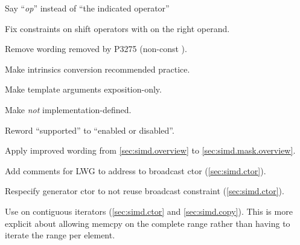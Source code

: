 \begin{revision}
\item Say “\textit{op}” instead of “the indicated operator”
\item Fix constraints on shift operators with \simdsizetype{} on the right operand.
\item Remove wording removed by P3275 (non-const ).
\item Make intrinsics conversion recommended practice.
\item Make  template arguments exposition-only.
\item Make  \emph{not} implementation-defined.
\item Reword “supported” to “enabled or disabled”.
\item Apply improved wording from \ref{sec:simd.overview} to \ref{sec:simd.mask.overview}.
\item Add comments for LWG to address to broadcast ctor (\ref{sec:simd.ctor}).
\item Respecify generator ctor to not reuse broadcast constraint (\ref{sec:simd.ctor}).
\item Use  on contiguous iterators (\ref{sec:simd.ctor} and \ref{sec:simd.copy}).
  This is more explicit about allowing memcpy on the complete range rather than
  having to iterate the range per element.
\end{revision}

